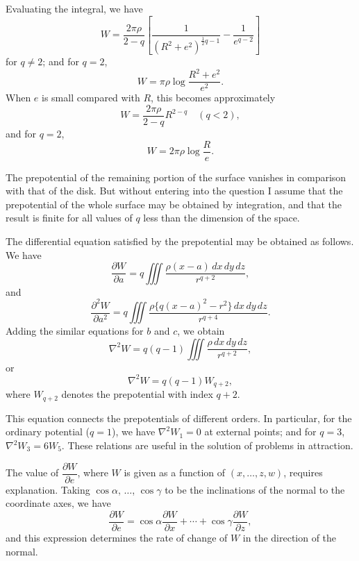 \documentclass[11pt,a4paper]{book}
\begin{document}
\begin{art}
Evaluating the integral, we have
\[
W = \frac{2\pi\rho}{2-q}\left[\frac{1}{(R^2+e^2)^{\frac{1}{2}q-1}} - \frac{1}{e^{q-2}}\right]
\]
for $q \neq 2$; and for $q=2$,
\[
W = \pi\rho\log\frac{R^2+e^2}{e^2}.
\]
When $e$ is small compared with $R$, this becomes approximately
\[
W = \frac{2\pi\rho}{2-q}R^{2-q} \quad (q < 2),
\]
and for $q = 2$,
\[
W = 2\pi\rho\log\frac{R}{e}.
\]
\end{art}

\begin{art}
The prepotential of the remaining portion of the surface vanishes in comparison with that of the disk. But without entering into the question I assume that the prepotential of the whole surface may be obtained by integration, and that the result is finite for all values of $q$ less than the dimension of the space.
\end{art}

\begin{art}
The differential equation satisfied by the prepotential may be obtained as follows. We have
\[
\frac{\partial W}{\partial a} = q \iiint \frac{\rho(x-a)\,dx\,dy\,dz}{r^{q+2}},
\]
and
\[
\frac{\partial^2 W}{\partial a^2} = q \iiint \frac{\rho\{q(x-a)^2 - r^2\}\,dx\,dy\,dz}{r^{q+4}}.
\]
Adding the similar equations for $b$ and $c$, we obtain
\[
\nabla^2 W = q(q-1) \iiint \frac{\rho\,dx\,dy\,dz}{r^{q+2}},
\]
or
\[
\nabla^2 W = q(q-1) W_{q+2},
\]
where $W_{q+2}$ denotes the prepotential with index $q+2$.
\end{art}

\begin{art}
This equation connects the prepotentials of different orders. In particular, for the ordinary potential ($q=1$), we have $\nabla^2 W_1 = 0$ at external points; and for $q=3$, $\nabla^2 W_3 = 6 W_5$. These relations are useful in the solution of problems in attraction.
\end{art}

\begin{art}
The value of $\dfrac{\partial W}{\partial e}$, where $W$ is given as a function of $(x, \ldots, z, w)$, requires explanation. Taking $\cos\alpha$, $\ldots$, $\cos\gamma$ to be the inclinations of the normal to the coordinate axes, we have
\[
\frac{\partial W}{\partial e} = \cos\alpha \frac{\partial W}{\partial x} + \cdots + \cos\gamma \frac{\partial W}{\partial z},
\]
and this expression determines the rate of change of $W$ in the direction of the normal.
\end{art}
\end{document}

